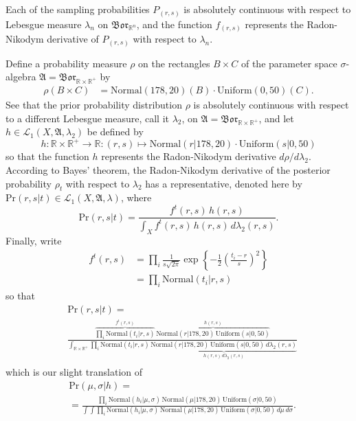 \documentclass[
twoside=true,
paper=letter,
fontsize=9pt,
pagesize=auto,
leqno,
openany,
headsepline,
overfullrule,
]{scrbook}
\theoremstyle{plain}
\theoremstyle{plain}
\theoremstyle{definition}
\theoremstyle{bfnoteitalic}
\theoremstyle{bfnoteroman}
\newcommand{\sigalg}[1]{\mathfrak{#1}}
\newcommand{\cali}[1]{\mathscr{#1}}
\newcommand{\borel}{\mathfrak{Bor}}
\newcommand{\textsigma}{\hbox{\large{$\sigma$}}\kern-1pt}
\newcommand{\R}{\mathbb{R}}
\newcommand{\function}{f}
\newcommand{\functioniii}{h}
\newcommand{\measurespace}{X}
\newcommand{\measureiii}{\lambda}
\newcommand{\setii}{B}
\newcommand{\setiii}{C}
\newcommand{\pspace}{\measurespace}%
\newcommand{\pspacesig}{\sigalg{A}}
\begin{document}
Each of the sampling probabilities $P_{(r,s)}$ is absolutely continuous with respect to Lebesgue measure
$\measureiii_n$ on $\borel_{\R^n}$, and
the function $\function_{(r,s)}$ represents the Radon-Nikodym derivative of 
$P_{(r,s)}$ with respect to $\measureiii_n$.

Define a probability measure $\rho$ on the rectangles $\setii\times\setiii$ of the parameter space \textsigma-algebra 
$\pspacesig=\borel_{\R\times\R^+}$ by
\begin{align*}
\rho(\setii\times\setiii)
&=\text{Normal}(178,20)(\setii)\cdot\text{Uniform}(0,50)(\setiii).
\end{align*}
See that the prior probability distribution $\rho$ is absolutely continuous with respect to a different Lebesgue measure, call it
$\lambda_2$, on $\pspacesig=\borel_{\R\times\R^+}$,
and let $\functioniii\in\cali{L}_1(\pspace,\pspacesig,\lambda_2)$ be defined by
\[
\functioniii:\R\times\R^+\to\R:(r,s)\mapsto
\text{Normal}(r\vert 178,20)\cdot
\text{Uniform}(s\vert 0,50)
\]
so that the function $\functioniii$ represents the Radon-Nikodym derivative $d\rho/d\lambda_2$.
According to Bayes' theorem, the Radon-Nikodym derivative of the posterior probability 
$\rho_t$ with respect to $\lambda_2$ has a representative, denoted here by 
$\text{Pr}(r,s\vert t)\in\cali{L}_1(\pspace, \pspacesig,\lambda)$,
where 
\[
\text{Pr}(r,s\vert t)
=
\frac{\function^t(r,s)\,\functioniii(r,s)}
{\int_{\pspace}\function^t(r,s)\,\functioniii(r,s)\,d\lambda_2(r,s)}.
\]
Finally, write 
\begin{align*}
\function^t (r,s)
& =
\prod_i
\frac{1}{s\sqrt{2\pi}}
\exp
\left\{
-\frac{1}{2}
\left(
\frac{t_i-r}{s}
\right)^2
\right\} \\
& = \prod_i\text{Normal}(t_i\vert r,s) 
\end{align*}
so that
\begin{align*}
& \text{Pr}(r,s\vert t) =
\\
&
\frac{
\overbrace{\textstyle{\prod_i}\text{Normal}(t_i\vert r,s)}^{\function^t(r,s)}\,
\overbrace{\text{Normal}(r\vert 178,20)\,
\text{Uniform}(s\vert 0,50)}^{\functioniii(r,s)}
}
{
\int_{\R\times\R^+}
\prod_i\text{Normal}(t_i\vert r,s)\,
\underbrace{\text{Normal}(r\vert 178,20)\,
\text{Uniform}(s\vert 0,50)\,
d\lambda_2(r,s)}_{\functioniii(r,s)\,d\lambda_2(r,s)}
}
\\
\end{align*}
which is our slight translation of 
\begin{align*}
& \text{Pr}(\mu,\sigma\vert h) =
\\
& =
\frac{
\prod_i
\text{Normal}(h_i\vert \mu,\sigma)
\,\text{Normal}(\mu\vert 178,20)
\,\text{Uniform}(\sigma\vert 0,50)
}
{
\int\int
\prod_i
\text{Normal}(h_i\vert \mu,\sigma)
\,\text{Normal}(\mu\vert 178,20)
\,\text{Uniform}(\sigma\vert 0,50)
\,d\mu\, d\sigma
}.
\\
\end{align*}
\end{document}
